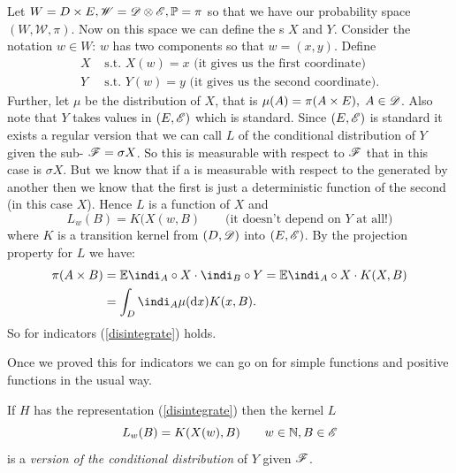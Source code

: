 \documentclass{report}
\begin{document}
\begin{fancyproof}
	Let $W=D\times E,\mathscr{W}=\mathscr{D}\otimes\mathscr{E},\mathbb{P}=\pi$ so that we have our probability space $(W,\mathscr{W},\pi)$. Now on this space we can define the \rv s $X$ and $Y$. Consider the notation $w\in W$: $w$ has two components so that $w=(x,y)$. Define
	\begin{align*}
		X &\text{ s.t. }X(w)=x\text{ (it gives us the first coordinate)}\\
		Y &\text{ s.t. }Y(w)=y\text{ (it gives us the second coordinate)}.
	\end{align*}
	Further, let $\mu$ be the distribution of $X$, that is $\mu(A)=\pi(A\times E),\;A\in\mathscr{D}$.
	Also note that $Y$ takes values in $(E,\mathscr{E})$ which is standard. Since $(E,\mathscr{E})$ is standard it exists a regular version that we can call $L$ of the conditional distribution of $Y$ given the sub-\sa{} $\mathscr{F}=\sigma X$. So this \rv{} is measurable with respect to $\mathscr{F}$ that in this case is $\sigma X$. But we know that if a \rv{} is measurable with respect to the \sa{} generated by another \rv{} then we know that the first \rv{} is just a deterministic function of the second \rv{} (in this case $X$). Hence $L$ is a function of $X$ and
	\begin{equation*}
		L_w(B)=K(X(w,B)\qquad\text{(it doesn't depend on $Y$ at all!)}
	\end{equation*}
	where $K$ is a transition kernel from $(D,\mathscr{D})$ into $(E,\mathscr{E})$. By the projection property for $L$ we have:
	\begin{align*}
		\pi(A\times B)&=\ev\indi_A\circ X\cdot\indi_B\circ Y=\ev\indi_A\circ X\cdot K(X,B)\\
		&=\int_D \indi_A\mu(\dx)K(x,B).
		\end{align*}
		So for indicators (\ref{disintegrate}) holds.
\end{fancyproof}
Once we proved this for indicators we can go on for simple functions and positive functions in the usual way.
\begin{theorem}
	If $H$ has the representation (\ref{disintegrate}) then the kernel $L$
	\begin{equation*}
		L_w(B)=K(X(w),B)\qquad w\in\mathbb{N},B\in\mathscr{E}
	\end{equation*}
	is a \emph{version of the conditional distribution} of $Y$ given $\mathscr{F}$.
\end{theorem}
\end{document}
